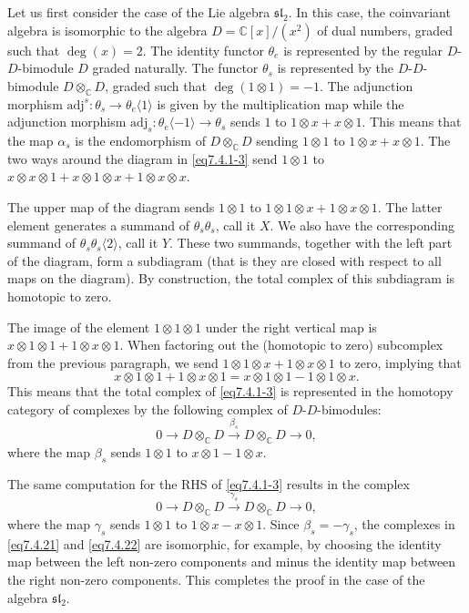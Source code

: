 \documentclass[a4paper]{amsart}
\begin{document}
Let us first consider the case of the Lie algebra $\mathfrak{sl}_2$. In this
case, the coinvariant algebra is isomorphic to the algebra $D=\mathbb{C}[x]/(x^2)$
of dual numbers, graded such that $\deg(x)=2$. The identity functor $\theta_e$ is represented by the regular $D$-$D$-bimodule $D$ graded naturally. 
The functor $\theta_s$ is represented by the $D$-$D$-bimodule 
$D\otimes_{\mathbb{C}}D$, graded  such that $\deg(1\otimes 1)=-1$.
The adjunction morphism $\mathrm{adj}^s:\theta_s\to\theta_e\langle 1\rangle$ 
is given by the  multiplication map while the adjunction morphism
$\mathrm{adj}_s:\theta_e\langle -1\rangle \to\theta_s$ sends 
$1$ to $1\otimes x+x\otimes 1$. This means that the map $\alpha_s$
is the endomorphism of $D\otimes_{\mathbb{C}}D$ sending 
$1\otimes 1$ to $1\otimes x+x\otimes 1$. 
The two ways around the diagram in \eqref{eq7.4.1-3}
send $1\otimes 1$ to $x\otimes x\otimes 1+x\otimes 1\otimes x+1\otimes x\otimes x$.

The upper map of the diagram sends $1\otimes 1$ to 
$1\otimes 1\otimes x+1\otimes x\otimes 1$. The latter element generates
a summand of $\theta_s\theta_s$, call it $X$. We also have the 
corresponding summand of $\theta_s\theta_s\langle 2\rangle$, call it $Y$.
These two summands, together with the left part of the diagram, form a
subdiagram (that is they are closed with respect to all maps on the diagram).
By construction, the total complex of this subdiagram is homotopic to zero.

The image of the element $1\otimes 1\otimes 1$ under the right vertical map is
$x\otimes 1\otimes 1+ 1\otimes x\otimes 1$. When factoring out the (homotopic to
zero) subcomplex from the previous paragraph, we send 
$1\otimes 1\otimes x+1\otimes x\otimes 1$ to zero, implying that 
\begin{displaymath}
x\otimes 1\otimes 1+ 1\otimes x\otimes 1=
x\otimes 1\otimes 1- 1\otimes 1\otimes x. 
\end{displaymath}
This means that the total complex of \eqref{eq7.4.1-3} is represented
in the homotopy category of complexes by the following complex of 
$D$-$D$-bimodules:
\begin{equation}\label{eq7.4.21}
0\longrightarrow  D\otimes_{\mathbb{C}}D
\overset{\beta_s}{\longrightarrow}  D\otimes_{\mathbb{C}}D 
\longrightarrow 0,
\end{equation}
where the map $\beta_s$ sends $1\otimes 1$ to $x\otimes 1- 1\otimes x$.

The same computation for the RHS of \eqref{eq7.4.1-3} results 
in the complex
\begin{equation}\label{eq7.4.22}
0\longrightarrow  D\otimes_{\mathbb{C}}D
\overset{\gamma_s}{\longrightarrow}  D\otimes_{\mathbb{C}}D 
\longrightarrow 0,
\end{equation}
where the map $\gamma_s$ sends $1\otimes 1$ to $1\otimes x- x\otimes 1$.
Since $\beta_s=-\gamma_s$, the complexes in \eqref{eq7.4.21} and
\eqref{eq7.4.22} are isomorphic, for example, by choosing the identity map between the
left non-zero components and minus the identity map between the right 
non-zero components. This completes the proof in the case of the algebra
$\mathfrak{sl}_2$.
\end{document}
